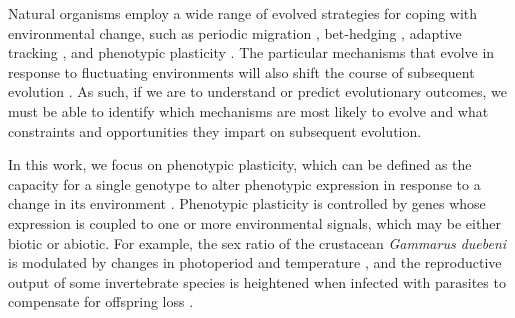 \begin{raggedbottom}
Natural organisms employ a wide range of evolved strategies for coping with environmental change, such as
periodic migration \citep{winger_long_2019},
bet-hedging \citep{beaumont_experimental_2009},
adaptive tracking \citep{barrett_adaptation_2008},
and phenotypic plasticity \citep{ghalambor_adaptive_2007}.
The particular mechanisms that evolve in response to fluctuating environments will also shift the course of subsequent evolution \citep{wennersten_population-level_2012,schaum_plasticity_2014}.
As such, if we are to understand or predict evolutionary outcomes, we must be able to identify which mechanisms are most likely to evolve and what constraints and opportunities they impart on subsequent evolution.

In this work, we focus on phenotypic plasticity, which can be defined as the capacity for a single genotype to alter phenotypic expression in response to a change in its environment \citep{west-eberhard_developmental_2003}.
Phenotypic plasticity is controlled by genes whose expression is coupled to one or more environmental signals, which may be either biotic or abiotic.
For example, the sex ratio of the crustacean \textit{Gammarus duebeni} is modulated by changes in photoperiod and temperature \citep{dunn_two_2005}, and the reproductive output of some invertebrate species is heightened when infected with parasites to compensate for offspring loss \citep{chadwick_parasite-mediated_2005}.



\end{raggedbottom}
